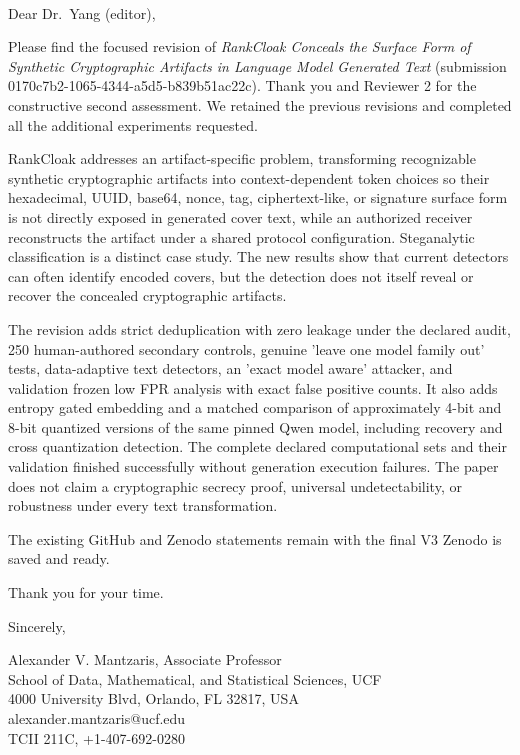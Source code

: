 \documentclass[10pt]{letter}
\begin{document}
\begin{letter}{\\}

\opening{Dear Dr.\ Yang (editor),}

Please find the focused revision of \emph{RankCloak Conceals the Surface Form of Synthetic Cryptographic Artifacts in Language Model Generated Text} (submission 0170c7b2-1065-4344-a5d5-b839b51ac22c). Thank you and Reviewer 2 for the constructive second assessment. We retained the previous revisions and completed all the additional experiments requested.

RankCloak addresses an artifact-specific problem, transforming recognizable synthetic cryptographic artifacts into context-dependent token choices so their hexadecimal, UUID, base64, nonce, tag, ciphertext-like, or signature surface form is not directly exposed in generated cover text, while an authorized receiver reconstructs the artifact under a shared protocol configuration. Steganalytic classification is a distinct case study. The new results show that current detectors can often identify encoded covers, but the detection does not itself reveal or recover the concealed cryptographic artifacts.

The revision adds strict  deduplication with zero leakage under the declared audit, 250 human-authored secondary controls, genuine 'leave one model family out' tests, data-adaptive text detectors, an 'exact model aware' attacker, and validation frozen low FPR analysis with exact false positive counts. It also adds entropy gated embedding and a matched comparison of approximately 4-bit and 8-bit quantized versions of the same pinned Qwen model, including recovery and cross quantization detection. The complete declared computational sets and their validation finished successfully without generation execution failures.
The paper does not claim a cryptographic secrecy proof, universal undetectability, or robustness under every text transformation.

The existing GitHub and Zenodo statements remain with the final V3 Zenodo is saved and ready.

Thank you for your time.

Sincerely,

Alexander V. Mantzaris, Associate Professor \\
School of Data, Mathematical, and Statistical Sciences, UCF \\
4000 University Blvd, Orlando, FL 32817, USA \\
alexander.mantzaris@ucf.edu \\
TCII 211C, +1-407-692-0280
\end{letter}
\end{document}
